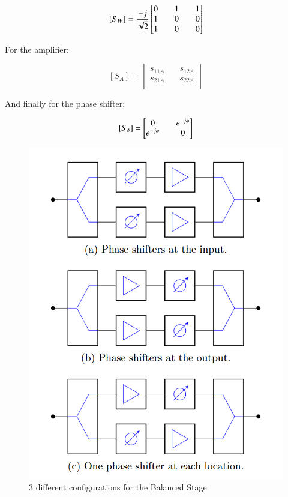 \documentclass[12pt]{report} %
\begin{document}
\[
[S_W] = \frac{-j}{\sqrt{2}} \* \begin{bmatrix}
0 & \quad 1 & \quad 1 \\
1 & \quad 0 & \quad 0 \\
1 & \quad 0 & \quad 0 \\
\end{bmatrix}
\]

For the amplifier:

\[
[S_A] = \begin{bmatrix}
s_{11A} & \quad s_{12A} \\
s_{21A} & \quad s_{22A} \\
\end{bmatrix}
\]

And finally for the phase shifter:

\[
[S_{\phi}] = \begin{bmatrix}
0 & \quad e^{-j \* \phi} \\
e^{-j \* \phi} & \quad 0 \\
\end{bmatrix}
\]

\begin{figure}[htbp]
    \centering
    \includegraphics[width=\textwidth]{images/design_circuit_elements/configurations_balanced_stage.png}
    \caption{3 different configurations for the Balanced Stage}
    \label{fig:design_circuit_elements:configurations_balanced_stage}
\end{figure}
\end{document}
